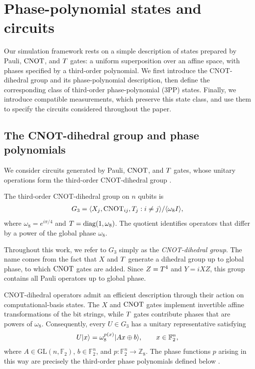 
\section{Phase-polynomial states and circuits}
\label{sec:phase-polynomial-states}

Our simulation framework rests on a simple description of states prepared by Pauli, $\operatorname{CNOT}$, and $T$ gates: a uniform superposition over an affine space, with phases specified by a third-order polynomial.
We first introduce the CNOT-dihedral group and its phase-polynomial description, then define the corresponding class of third-order phase-polynomial (3PP) states.
Finally, we introduce compatible measurements, which preserve this state class, and use them to specify the circuits considered throughout the paper.

\subsection{The CNOT-dihedral group and phase polynomials}

We consider circuits generated by Pauli, $\operatorname{CNOT}$, and $T$ gates, whose unitary operations form the third-order CNOT-dihedral group \cite{cross2016scalable}.

\begin{definition}
    The third-order CNOT-dihedral group on $n$ qubits is
    \begin{align}
        G_3 = \langle X_j, \operatorname{CNOT}_{ij}, T_j : i \neq j \rangle / \langle \omega_8 I \rangle,
    \end{align}
    where $\omega_8 = e^{i\pi/4}$ and $T = \operatorname{diag}(1,\omega_8)$.
    The quotient identifies operators that differ by a power of the global phase $\omega_8$.
\end{definition}

Throughout this work, we refer to $G_3$ simply as the \emph{CNOT-dihedral group}.
The name comes from the fact that $X$ and $T$ generate a dihedral group up to global phase, to which $\operatorname{CNOT}$ gates are added.
Since $Z=T^4$ and $Y=iXZ$, this group contains all Pauli operators up to global phase.

CNOT-dihedral operators admit an efficient description through their action on computational-basis states.
The $X$ and $\operatorname{CNOT}$ gates implement invertible affine transformations of the bit strings, while $T$ gates contribute phases that are powers of $\omega_8$.
Consequently, every $U\in G_3$ has a unitary representative satisfying
\begin{align}
    U|x\rangle = \omega_8^{p(x)}|Ax\oplus b\rangle,
    \qquad x\in\mathbb{F}_2^n,
\end{align}
where $A\in\mathrm{GL}(n,\mathbb{F}_2)$, $b\in\mathbb{F}_2^n$, and $p:\mathbb{F}_2^n\to\mathbb{Z}_8$.
The phase functions $p$ arising in this way are precisely the third-order phase polynomials defined below \cite{amy2013meetinthemiddle,campbell2017unified,amy2019tcount,amy2018finite}.

